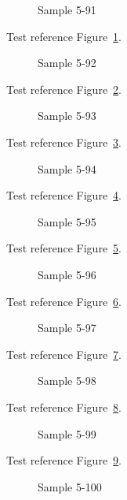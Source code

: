\begin{figure}[tbhp]
\caption{Sample 5-91}
\label{fig:sample-5-91}
\end{figure}

Test reference Figure~\ref{fig:sample-5-91}.

\begin{figure}[tbhp]
\caption{Sample 5-92}
\label{fig:sample-5-92}
\end{figure}

Test reference Figure~\ref{fig:sample-5-92}.

\begin{figure}[tbhp]
\caption{Sample 5-93}
\label{fig:sample-5-93}
\end{figure}

Test reference Figure~\ref{fig:sample-5-93}.

\begin{figure}[tbhp]
\caption{Sample 5-94}
\label{fig:sample-5-94}
\end{figure}

Test reference Figure~\ref{fig:sample-5-94}.

\begin{figure}[tbhp]
\caption{Sample 5-95}
\label{fig:sample-5-95}
\end{figure}

Test reference Figure~\ref{fig:sample-5-95}.

\begin{figure}[tbhp]
\caption{Sample 5-96}
\label{fig:sample-5-96}
\end{figure}

Test reference Figure~\ref{fig:sample-5-96}.

\begin{figure}[tbhp]
\caption{Sample 5-97}
\label{fig:sample-5-97}
\end{figure}

Test reference Figure~\ref{fig:sample-5-97}.

\begin{figure}[tbhp]
\caption{Sample 5-98}
\label{fig:sample-5-98}
\end{figure}

Test reference Figure~\ref{fig:sample-5-98}.

\begin{figure}[tbhp]
\caption{Sample 5-99}
\label{fig:sample-5-99}
\end{figure}

Test reference Figure~\ref{fig:sample-5-99}.

\begin{figure}[tbhp]
\caption{Sample 5-100}
\label{fig:sample-5-100}
\end{figure}

